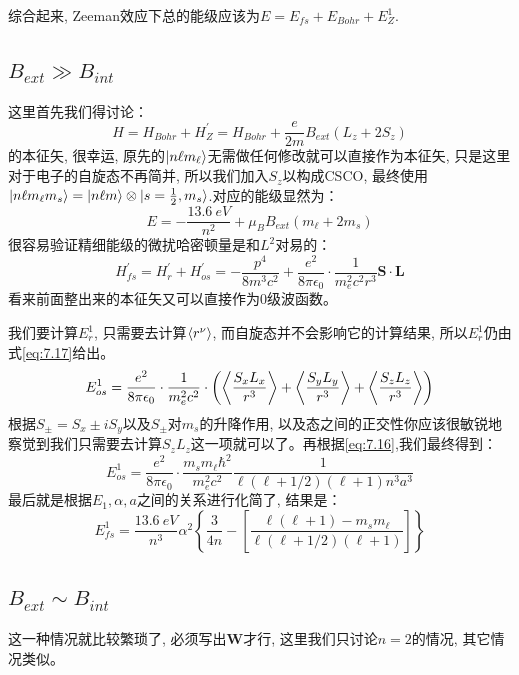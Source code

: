 \documentclass[a4paper,zihao=-4,linespread=1]{ctexrep}
\begin{document}
    综合起来, Zeeman效应下总的能级应该为$E=E_{fs}+E_{Bohr}+E_{Z}^1$.
    \subsection*{$B_{ext}\gg B_{int}$}
    这里首先我们得讨论：
    \[H=H_{Bohr}+H_Z^\prime=H_{Bohr}+\frac{e}{2m}B_{ext}\left(L_z+2S_z\right)\]
    的本征矢, 很幸运, 原先的$\ket{n\ell m_\ell}$无需做任何修改就可以直接作为本征矢, 只是这里对于电子的自旋态不再简并, 所以我们加入$S_z$以构成CSCO, 最终使用$\ket{n\ell m_\ell m_s}=
    \ket{n\ell m}\otimes\ket{s=\frac{1}{2},m_s}$.对应的能级显然为：
    \begin{equation}
        E=-\frac{\SI{13.6}{eV}}{n^2}+\mu_BB_{ext}\left(m_\ell+2m_s \right)
    \end{equation}
    很容易验证精细能级的微扰哈密顿量是和$L^2$对易的：
    \begin{equation}
        H_{fs}^\prime=H_r^\prime+H_{os}^\prime=-\frac{p^4}{8m^3c^2}+\frac{e^2}{8\pi\epsilon_0}\cdot\frac{1}{m_e^2c^2r^3}\mathbf{S}\cdot\mathbf{L}
    \end{equation}
    看来前面整出来的本征矢又可以直接作为0级波函数。

    我们要计算$E_r^1$, 只需要去计算$\braket{r^\nu}$, 而自旋态并不会影响它的计算结果, 所以$E_r^1$仍由式\ref{eq:7.17}给出。
    \[E_{os}^1=\frac{e^2}{8\pi\epsilon_0}\cdot\frac{1}{m_e^2c^2}\cdot\left(\Braket{\frac{S_xL_x}{r^3}}+\Braket{\frac{S_yL_y}{r^3}}+\Braket{\frac{S_zL_z}{r^3}}\right)\]
    根据$S_{\pm}=S_x\pm iS_y$以及$S_\pm$对$m_s$的升降作用, 以及态之间的正交性你应该很敏锐地察觉到我们只需要去计算$S_zL_z$这一项就可以了。再根据\ref{eq:7.16},我们最终得到：
    \[E_{os}^1=\frac{e^2}{8\pi\epsilon_0}\cdot\frac{m_sm_\ell\hbar^2}{m_e^2c^2}\frac{1}{\ell(\ell+1/2)(\ell+1)n^3a^3}\]
    最后就是根据$E_1,\alpha,a$之间的关系进行化简了, 结果是：
    \begin{equation}
        \label{eq:7.29}
        E_{fs}^1=\frac{\SI{13.6}{eV}}{n^3}\alpha^2\left\{\frac{3}{4n}-\left[\frac{\ell(\ell+1)-m_sm_\ell}{\ell(\ell+1/2)(\ell+1)}\right]\right\}
    \end{equation}
    \subsection*{$B_{ext}\sim B_{int}$}
    这一种情况就比较繁琐了, 必须写出$\mathbf{W}$才行, 这里我们只讨论$n=2$的情况, 其它情况类似。
\end{document}
